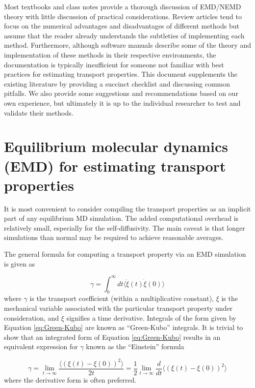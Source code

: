 \documentclass[9pt,bestpractices]{livecoms}
\begin{document}
Most textbooks and class notes provide a thorough discussion of EMD/NEMD theory with little discussion of practical considerations. Review articles tend to focus on the numerical advantages and disadvantages of different methods but assume that the reader already understands the subtleties of implementing each method. Furthermore, although software manuals describe some of the theory and implementation of these methods in their respective environments, the documentation is typically insufficient for someone not familiar with best practices for estimating transport properties. This document supplements the existing literature by providing a succinct checklist and discussing common pitfalls. We also provide some suggestions and recommendations based on our own experience, but ultimately it is up to the individual researcher to test and validate their methods.

\section{Equilibrium molecular dynamics (EMD) for estimating transport properties}

It is most convenient to consider compiling the transport properties as an implicit part of any equilibrium MD simulation. The added computational overhead is relatively small, especially for the self-diffusivity. The main caveat is that longer simulations than normal may be required to achieve reasonable averages.

The general formula for computing a transport property via an EMD simulation is given as

\begin{equation} \label{eq:Green-Kubo}
\gamma = \int_{0}^{\infty}dt\langle\dot{\xi}(t)\dot{\xi}(0)\rangle
\end{equation}
where $\gamma$ is the transport coefficient (within a multiplicative constant), $\xi$ is the mechanical variable associated with the particular transport property under consideration, and $\dot{\xi}$ signifies a time derivative. Integrals of the form given by Equation \ref{eq:Green-Kubo} are known as “Green-Kubo” integrals. It is trivial to show that an integrated form of Equation \ref{eq:Green-Kubo} results in an equivalent expression for $\gamma$ known as the “Einstein” formula

\begin{equation} \label{eq:Einstein}
\gamma = \lim_{t\to\infty} \frac{\langle (\xi(t)-\xi(0))^2 \rangle}{2t} = \frac{1}{2} \lim_{t\to\infty} \frac{d}{dt} \langle (\xi(t)-\xi(0))^2 \rangle
\end{equation}
where the derivative form is often preferred.
\end{document}
